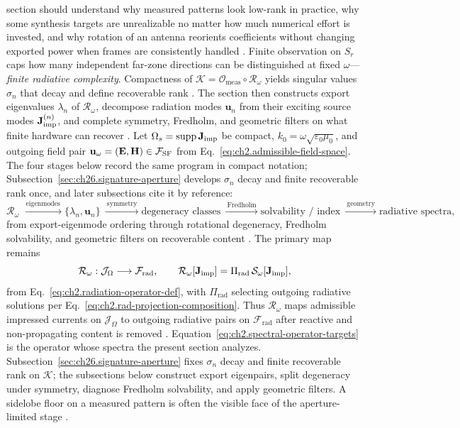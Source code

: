 section should understand why measured patterns look low-rank in practice, why some synthesis
targets are unrealizable no matter how much numerical effort is invested, and why rotation of an
antenna reorients coefficients without changing exported power when frames are consistently
handled \cite{harrington2001}.
Finite observation on $S_r$ caps how many independent far-zone directions can be distinguished at
fixed $\omega$---\emph{finite radiative complexity}. Compactness of
$\mathcal{K}=\mathcal{O}_{\mathrm{meas}}\circ\mathcal{R}_\omega$ yields singular values
$\sigma_n$ that decay and define recoverable rank \cite{hansen1988}. The section then constructs export
eigenvalues $\lambda_n$ of $\mathcal{R}_\omega$, decompose radiation modes
$\mathbf{u}_n$ from their exciting source modes $\mathbf{J}_{\mathrm{imp}}^{(n)}$, and complete symmetry,
Fredholm, and geometric filters on what finite hardware can recover \cite{stratton1941}. Let
$\Omega_s=\operatorname{supp}\mathbf{J}_{\mathrm{imp}}$ be compact, $k_0=\omega\sqrt{\varepsilon_0\mu_0}$, and
outgoing field pair $\mathbf{u}_\omega=(\mathbf{E},\mathbf{H})\in\mathcal{F}_{\mathrm{SF}}$ from
Eq.~\eqref{eq:ch2.admissible-field-space}. The four stages below record the same program in
compact notation; Subsection~\ref{sec:ch26.signature-aperture} develops $\sigma_n$ decay and
finite recoverable rank once, and later subsections cite it by reference:
\begin{equation}
\label{eq:ch2.section26-spectral-chain}
\mathcal{R}_\omega
\ \xrightarrow{\ \text{eigenmodes}\ }
\{\lambda_n,\mathbf{u}_n\}
\ \xrightarrow{\ \text{symmetry}\ }
\text{degeneracy classes}
\ \xrightarrow{\ \text{Fredholm}\ }
\text{solvability / index}
\ \xrightarrow{\ \text{geometry}\ }
\text{radiative spectra},
\end{equation}
from export-eigenmode ordering through rotational degeneracy, Fredholm solvability, and geometric
filters on recoverable content \cite{stratton1941}.
The primary map remains
\begin{equation}
\label{eq:ch2.spectral-operator-targets}
\mathcal{R}_\omega:\mathcal{J}_\Omega\longrightarrow\mathcal{F}_{\mathrm{rad}},
\qquad
\mathcal{R}_\omega[\mathbf{J}_{\mathrm{imp}}]=\Pi_{\mathrm{rad}}\,\mathcal{S}_\omega[\mathbf{J}_{\mathrm{imp}}],
\end{equation}
from Eq.~\eqref{eq:ch2.radiation-operator-def}, with $\Pi_{\mathrm{rad}}$ selecting outgoing
radiative solutions per Eq.~\eqref{eq:ch2.rad-projection-composition}. Thus
$\mathcal{R}_\omega$ maps admissible impressed currents on $\mathcal{J}_\Omega$ to
outgoing radiative pairs on $\mathcal{F}_{\mathrm{rad}}$ after reactive and non-propagating
content is removed \cite{stratton1941}. Equation~\eqref{eq:ch2.spectral-operator-targets}
is the operator whose spectra the present section analyzes. Subsection~\ref{sec:ch26.signature-aperture}
fixes $\sigma_n$ decay and finite recoverable rank on $\mathcal{K}$; the subsections below
construct export eigenpairs, split degeneracy under symmetry, diagnose Fredholm solvability, and
apply geometric filters. A sidelobe floor on a measured pattern is often the visible face of
the aperture-limited stage \cite{hansen1988}.
